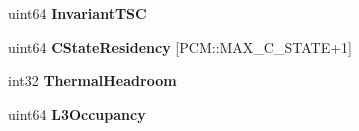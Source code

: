 \begin{DoxyCompactItemize}
\begin{tabbing}
\end{tabbing}\item 
uint64 {\bfseries Invariant\+T\+S\+C}\label{classBasicCounterState_af357162e5b43c6dfc0ce92fd56fa30a0}

\item 
uint64 {\bfseries C\+State\+Residency} [P\+C\+M\+::\+M\+A\+X\+\_\+\+C\+\_\+\+S\+T\+A\+T\+E+1]\label{classBasicCounterState_af9069c972052bac5ed648e519e03da9c}

\item 
int32 {\bfseries Thermal\+Headroom}\label{classBasicCounterState_a4950fe3761b2ac599a7ae64ec7bee973}

\item 
uint64 {\bfseries L3\+Occupancy}\label{classBasicCounterState_a99dab23e20418b86be72dda1ecd8858c}

\end{DoxyCompactItemize}

